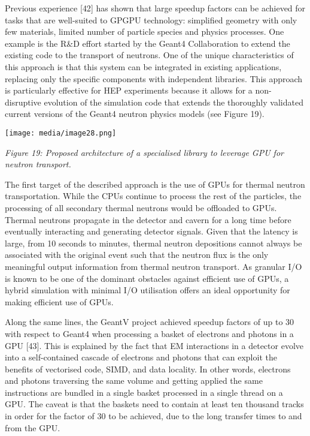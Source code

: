 \documentclass[12pt,a4paper]{article}
\begin{document}
Previous experience {[}42{]} has shown that large speedup factors can be
achieved for tasks that are well-suited to GPGPU technology: simplified
geometry with only few materials, limited number of particle species and
physics processes. One example is the R\&D effort started by the Geant4
Collaboration to extend the existing code to the transport of neutrons.
One of the unique characteristics of this approach is that this system
can be integrated in existing applications, replacing only the specific
components with independent libraries. This approach is particularly
effective for HEP experiments because it allows for a non-disruptive
evolution of the simulation code that extends the thoroughly validated
current versions of the Geant4 neutron physics models (see Figure 19).

\texttt{[image: media/image28.png]}

\emph{Figure 19: Proposed architecture of a specialised library to
leverage GPU for neutron transport.}

The first target of the described approach is the use of GPUs for
thermal neutron transportation. While the CPUs continue to process the
rest of the particles, the processing of all secondary thermal neutrons
would be offloaded to GPUs. Thermal neutrons propagate in the detector
and cavern for a long time before eventually interacting and generating
detector signals. Given that the latency is large, from 10 seconds to
minutes, thermal neutron depositions cannot always be associated with
the original event such that the neutron flux is the only meaningful
output information from thermal neutron transport. As granular I/O is
known to be one of the dominant obstacles against efficient use of GPUs,
a hybrid simulation with minimal I/O utilisation offers an ideal
opportunity for making efficient use of GPUs.

Along the same lines, the GeantV project achieved speedup factors of up
to 30 with respect to Geant4 when processing a basket of electrons and
photons in a GPU {[}43{]}. This is explained by the fact that EM
interactions in a detector evolve into a self-contained cascade of
electrons and photons that can exploit the benefits of vectorised code,
SIMD, and data locality. In other words, electrons and photons
traversing the same volume and getting applied the same instructions are
bundled in a single basket processed in a single thread on a GPU. The
caveat is that the baskets need to contain at least ten thousand tracks
in order for the factor of 30 to be achieved, due to the long transfer
times to and from the GPU.
\end{document}
